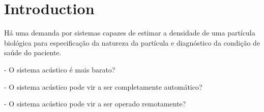 \section{Introduction}
\label{sec:introduction}

Há uma demanda por sistemas capazes de estimar a densidade de uma partícula biológica para especificação da natureza da partícula e diagnóstico da condição de saúde do paciente.

- O sistema acústico é mais barato?

- O sistema acústico pode vir a ser completamente automático?

- O sistema acústico pode vir a ser operado remotamente?

